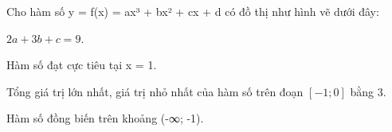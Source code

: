 \begin{question}[type=true_false,difficulty=3,code={II-1}]
Cho hàm số y = f(x) = ax³ + bx² + cx + d có đồ thị như hình vẽ dưới đây:



\begin{statement}[correct=false,label=a]
$ 2a + 3b + c = 9 $.
\end{statement}

\begin{statement}[correct=false,label=b]
Hàm số đạt cực tiêu tại x = 1.
\end{statement}

\begin{statement}[correct=true,label=c]
Tổng giá trị lớn nhất, giá trị nhỏ nhất của hàm số trên đoạn $ [-1;0] $ bằng 3.
\end{statement}

\begin{statement}[correct=false,label=d]
Hàm số đồng biến trên khoảng (-∞; -1).
\end{statement}

\end{question}